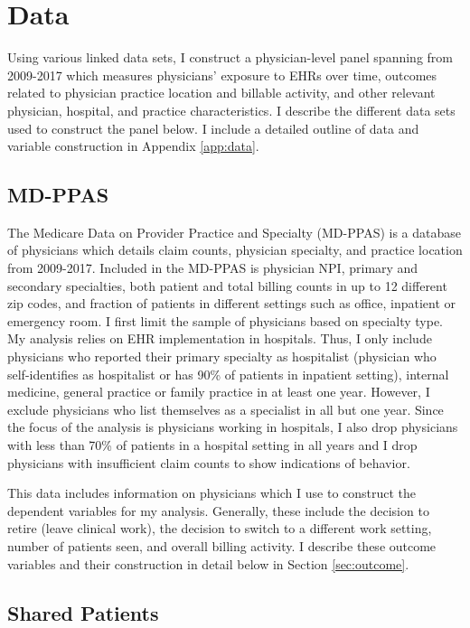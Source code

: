 \documentclass[11pt]{article}
\begin{document}
\section{Data}

Using various linked data sets, I construct a physician-level panel spanning from 2009-2017 which measures physicians' exposure to EHRs over time, outcomes related to physician practice location and billable activity, and other relevant physician, hospital, and practice characteristics. I describe the different data sets used to construct the panel below. I include a detailed outline of data and variable construction in Appendix \ref{app:data}.

\subsection{MD-PPAS}

The Medicare Data on Provider Practice and Specialty (MD-PPAS) is a database of physicians which details claim counts, physician specialty, and practice location from 2009-2017. Included in the MD-PPAS is physician NPI, primary and secondary specialties, both patient and total billing counts in up to 12 different zip codes, and fraction of patients in different settings such as office, inpatient or emergency room. I first limit the sample of physicians based on specialty type. My analysis relies on EHR implementation in hospitals. Thus, I only include physicians who reported their primary specialty as hospitalist (physician who self-identifies as hospitalist or has 90\% of patients in inpatient setting), internal medicine, general practice or family practice in at least one year. However, I exclude physicians who list themselves as a specialist in all but one year. Since the focus of the analysis is physicians working in hospitals, I also drop physicians with less than 70\% of patients in a hospital setting in all years and I drop physicians with insufficient claim counts to show indications of behavior.

This data includes information on physicians which I use to construct the dependent variables for my analysis. Generally, these include the decision to retire (leave clinical work), the decision to switch to a different work setting, number of patients seen, and overall billing activity. I describe these outcome variables and their construction in detail below in Section \ref{sec:outcome}.


\subsection{Shared Patients}
\end{document}
